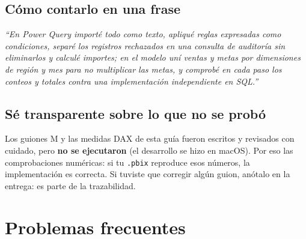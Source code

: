 \documentclass[11pt,letterpaper]{article}
\begin{document}
\subsection{Cómo contarlo en una frase}

\emph{``En Power Query importé todo como texto, apliqué reglas expresadas como condiciones, separé los registros rechazados en una consulta
de auditoría sin eliminarlos y calculé importes; en el modelo uní ventas y metas por dimensiones de región y mes para no
multiplicar las metas, y comprobé en cada paso los conteos y totales contra una implementación independiente en SQL.''}

\subsection{Sé transparente sobre lo que no se probó}

Los guiones M y las medidas DAX de esta guía fueron escritos y revisados con cuidado, pero \textbf{no se ejecutaron}
(el desarrollo se hizo en macOS). Por eso las comprobaciones numéricas: si tu \texttt{.pbix} reproduce esos números,
la implementación es correcta. Si tuviste que corregir algún guion, anótalo en la entrega: es parte de la trazabilidad.

\section{Problemas frecuentes}
\label{sec:problemas}
\end{document}
